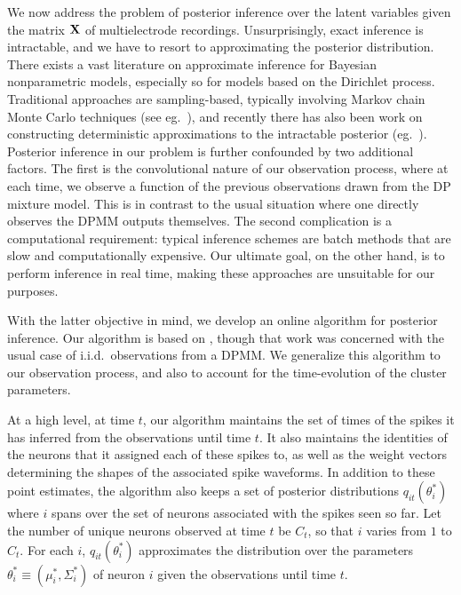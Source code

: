 \newcommand{\tx}{\tilde{x}}


We now address the problem of posterior inference over the latent variables given the matrix $\mathbf{X}$ of multielectrode recordings. Unsurprisingly, exact 
inference is intractable, and we have to resort to approximating the posterior distribution.
There exists a vast literature on approximate inference for Bayesian nonparametric models, especially so for models based on the Dirichlet process.
Traditional approaches are sampling-based, typically involving Markov chain Monte Carlo techniques (see eg.\ \citep{Nea2000, IshJam2001}), 
and recently there has also been work on constructing deterministic approximations to the intractable posterior (eg.\ \citep{BleJor2006, MinGha2003}).
Posterior inference in our problem is further confounded by two additional factors. The first is the convolutional nature of our observation process, 
where at each time,
we observe a function of the previous observations drawn from the DP mixture model. This is in contrast to the usual situation where one directly observes 
the DPMM outputs themselves.
The second complication is a computational requirement: typical inference schemes are batch methods that are slow and computationally expensive. 
Our ultimate goal, on the other hand, is to perform inference in real time, making these approaches are unsuitable for our purposes.

With the latter objective in mind, we develop an online algorithm for posterior inference. Our algorithm is based on 
\citep{WangDun2009}, though that work was concerned with the usual case of i.i.d.\ observations from a DPMM. We generalize this algorithm to our 
observation process, and also to account for the time-evolution of the cluster parameters.

At a high level, at time $t$, our algorithm maintains the set of times of the spikes it has inferred from the observations until time $t$. It also maintains
the identities of the neurons that it assigned each of these spikes to, as well as the weight vectors determining the shapes of the associated spike 
waveforms. In addition to these point estimates, the algorithm also keeps a set of posterior distributions $q_{it}(\theta^*_i)$ where $i$ spans over the
set of neurons associated with the spikes seen so far. Let the number of unique neurons observed at time $t$ be $C_t$, so that $i$ varies from $1$ to $C_t$.
For each $i$, $q_{it}(\theta^*_i)$ approximates the distribution over the parameters 
$\theta_i^* \equiv (\mu_i^*, \Sigma_i^*)$ of neuron $i$ given the observations until time $t$. 

